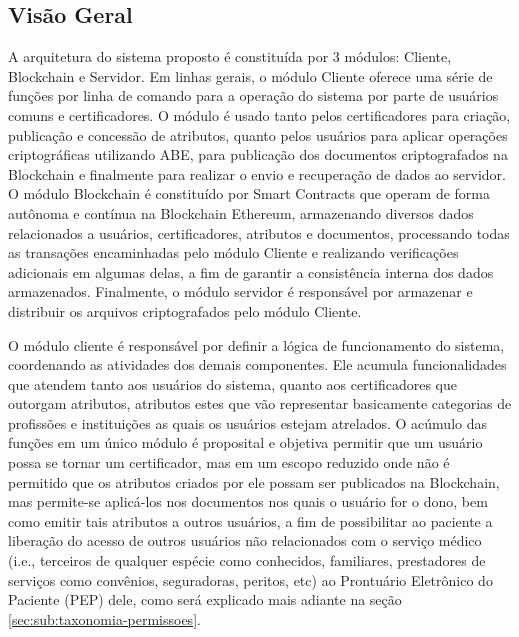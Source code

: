 \documentclass[a4paper,11pt]{article}
\begin{document}
\subsection{Visão Geral}
\label{sec:sub:visaogeral}


A arquitetura do sistema proposto é constituída por 3 módulos: Cliente, Blockchain e Servidor.
Em linhas gerais, o módulo Cliente oferece uma série de funções por linha de comando para a operação do sistema por parte de usuários comuns e certificadores.
O módulo é usado tanto pelos certificadores para criação, publicação e concessão de atributos, quanto pelos usuários para aplicar operações criptográficas utilizando ABE, para publicação dos documentos criptografados na Blockchain e finalmente para realizar o envio e recuperação de dados ao servidor.
O módulo Blockchain é constituído por Smart Contracts que operam de forma autônoma e contínua na Blockchain Ethereum, armazenando diversos dados relacionados a usuários, certificadores, atributos e documentos, processando todas as transações encaminhadas pelo módulo Cliente e realizando verificações adicionais em algumas delas, a fim de garantir a consistência interna dos dados armazenados.
Finalmente, o módulo servidor é responsável por armazenar e distribuir os arquivos criptografados pelo módulo Cliente.


O módulo cliente é responsável por definir a lógica de funcionamento do sistema, coordenando as atividades dos demais componentes.
Ele acumula funcionalidades que atendem tanto aos usuários do sistema, quanto aos certificadores que outorgam atributos, atributos estes que vão representar basicamente categorias de profissões e instituições as quais os usuários estejam atrelados.
O acúmulo das funções em um único módulo é proposital e objetiva permitir que um usuário possa se tornar um certificador, mas em um escopo reduzido onde não é permitido que os atributos criados por ele possam ser publicados na Blockchain, mas permite-se aplicá-los nos documentos nos quais o usuário for o dono, bem como emitir tais atributos a outros usuários, a fim de possibilitar ao paciente a liberação do acesso de outros usuários não relacionados com o serviço médico (i.e., terceiros de qualquer espécie como conhecidos, familiares, prestadores de serviços como convênios, seguradoras, peritos, etc) ao Prontuário Eletrônico do Paciente (PEP) dele, como será explicado mais adiante na seção \ref{sec:sub:taxonomia-permissoes}.
\end{document}
